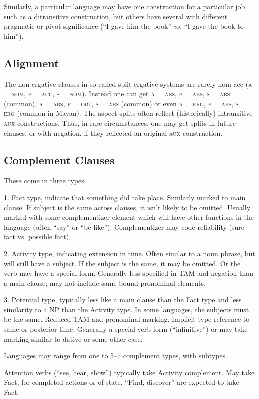 \documentclass[11pt]{article}
\newcommand{\I}[1]{\textsc{#1}}   %
\begin{document}
Similarly, a particular language may have one construction for a
particular job, such as a ditransitive construction, but others have
several with different pragmatic or pivot significance (``I gave him
the book'' \textit{vs.} ``I gave the book to him'').

\subsection{Alignment}
The non-ergative clauses in so-called split ergative systems are
rarely nom-acc (\I{a = nom, p = acc, s = nom}).  Instead one can get
\I{a = abs, p = abs, s = abs} (common), \I{a = abs, p = obl, s = abs}
(common) or even \I{a = erg, p = abs, s = erg} (common in Mayan).  The
aspect splits often reflect (historically) intransitive \I{aux}
constructions.  Thus, in rare circumstances, one may get splits in
future clauses, or with negation, if they reflected an original
\I{aux} construction.

\subsection{Complement Clauses}
These come in three types.

1.  Fact type, indicate that something did take place.  Similarly
marked to main clause.  If subject is the same across clauses, it
isn't likely to be omitted.  Usually marked with some complementizer
element which will have other functions in the language (often ``say''
or ``be like'').  Complementizer may code reliability (sure fact
vs. possible fact).

2. Activity type, indicating extension in time.  Often similar to a
noun phrase, but will still have a subject.  If the subject is the
same, it may be omitted.  Or the verb may have a special form.
Generally less specified in TAM and negation than a main clause; may
not include same bound pronominal elements.

3. Potential type, typically less like a main clause than the Fact
type and less similarity to a NP than the Activity type.  In some
languages, the subjects must be the same.  Reduced TAM and pronominal
marking.  Implicit type reference to same or posterior time.
Generally a special verb form (``infinitive'') or may take marking
similar to dative or some other case.

Languages may range from one to 5--7 complement types, with subtypes.

Attention verbs (``see, hear, show'') typically take Activity
complement.  May take Fact, for completed actions or of state.
``Find, discover'' are expected to take Fact.
\end{document}
